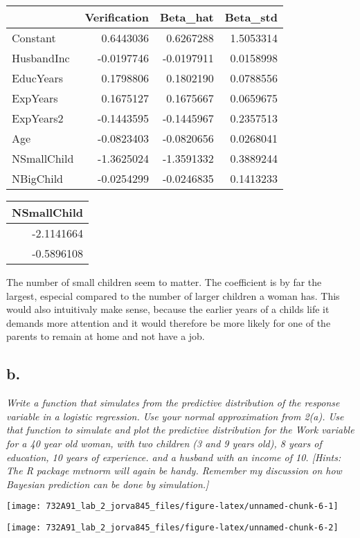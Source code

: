 \documentclass[]{article}
\begin{document}
\begin{longtable}[]{@{}lrrr@{}}
\toprule
& Verification & Beta\_hat & Beta\_std\tabularnewline
\midrule
\endhead
Constant & 0.6443036 & 0.6267288 & 1.5053314\tabularnewline
HusbandInc & -0.0197746 & -0.0197911 & 0.0158998\tabularnewline
EducYears & 0.1798806 & 0.1802190 & 0.0788556\tabularnewline
ExpYears & 0.1675127 & 0.1675667 & 0.0659675\tabularnewline
ExpYears2 & -0.1443595 & -0.1445967 & 0.2357513\tabularnewline
Age & -0.0823403 & -0.0820656 & 0.0268041\tabularnewline
NSmallChild & -1.3625024 & -1.3591332 & 0.3889244\tabularnewline
NBigChild & -0.0254299 & -0.0246835 & 0.1413233\tabularnewline
\bottomrule
\end{longtable}

\begin{longtable}[]{@{}r@{}}
\toprule
NSmallChild\tabularnewline
\midrule
\endhead
-2.1141664\tabularnewline
-0.5896108\tabularnewline
\bottomrule
\end{longtable}

The number of small children seem to matter. The coefficient is by far
the largest, especial compared to the number of larger children a woman
has. This would also intuitivaly make sense, because the earlier years
of a childs life it demands more attention and it would therefore be
more likely for one of the parents to remain at home and not have a job.

\hypertarget{b.-1}{%
\subsection{b.}\label{b.-1}}

\emph{Write a function that simulates from the predictive distribution
of the response variable in a logistic regression. Use your normal
approximation from 2(a). Use that function to simulate and plot the
predictive distribution for the Work variable for a 40 year old woman,
with two children (3 and 9 years old), 8 years of education, 10 years of
experience. and a husband with an income of 10. {[}Hints: The R package
mvtnorm will again be handy. Remember my discussion on how Bayesian
prediction can be done by simulation.{]}}

\begin{center}\texttt{[image: 732A91\_lab\_2\_jorva845\_files/figure-latex/unnamed-chunk-6-1]} \end{center}

\begin{center}\texttt{[image: 732A91\_lab\_2\_jorva845\_files/figure-latex/unnamed-chunk-6-2]} \end{center}
\end{document}
